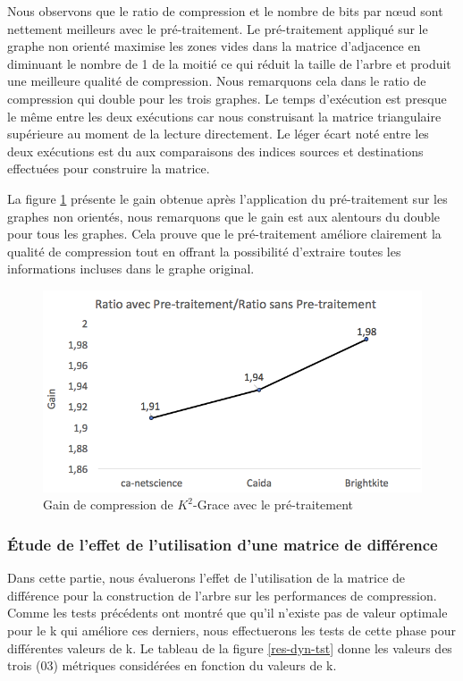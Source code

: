 Nous observons que le ratio de compression et le nombre de bits par nœud sont nettement meilleurs avec le pré-traitement. Le pré-traitement appliqué sur le graphe non orienté maximise les zones vides dans la matrice d'adjacence en diminuant le nombre de 1 de la moitié ce qui réduit la taille de l'arbre et produit une meilleure qualité de compression. Nous remarquons cela dans le ratio de compression qui double pour les trois graphes. Le temps d'exécution est presque le même entre les deux exécutions car nous construisant la matrice triangulaire supérieure au moment de la lecture directement. Le léger écart noté entre les deux exécutions est du aux comparaisons des indices sources et destinations effectuées pour construire la matrice. 

La figure \ref{fig:gain } présente le gain obtenue après l'application du pré-traitement sur les graphes non orientés, nous remarquons que le gain est aux alentours du double pour tous les graphes. Cela prouve que le pré-traitement améliore clairement la qualité de compression tout en offrant la possibilité d'extraire toutes les informations incluses dans le graphe original.

\begin{figure}[H]
	\centering
	\includegraphics[scale=0.5]{ressources/image/Tests/gain.png}
	
	\caption{Gain de compression de $K^2$-Grace avec le pré-traitement}
	\label{fig:gain }
\end{figure}


\subsubsection{Étude de l'effet de l'utilisation d'une matrice de différence}

Dans cette partie, nous évaluerons l'effet de l'utilisation de la matrice de différence pour la construction de l'arbre sur les performances de compression. Comme les tests précédents ont montré que qu'il n'existe pas de valeur optimale pour le k qui améliore ces derniers, nous effectuerons les tests de cette phase pour différentes valeurs de k. Le tableau de la figure \ref{res-dyn-tst} donne les valeurs des trois (03) métriques considérées en fonction du valeurs de k.


